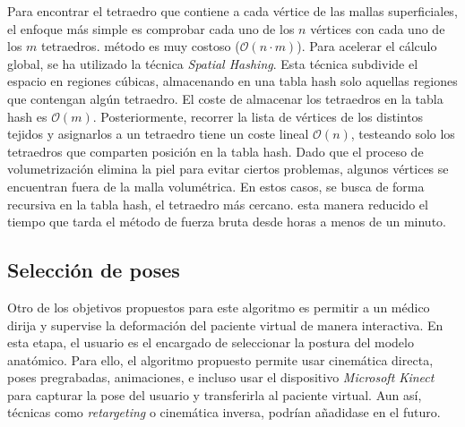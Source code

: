 Para encontrar el tetraedro que contiene a cada vértice de las mallas superficiales, el enfoque más simple es comprobar cada uno de los $n$ vértices con cada uno de los $m$ tetraedros. 
%
  método es muy costoso ($\mathcal{O}(n \cdot m)$). Para acelerar el cálculo global, se ha utilizado la técnica \emph{Spatial Hashing}\cite{Teschner2003}. Esta técnica subdivide el espacio en regiones cúbicas, almacenando en una \ac{tabla hash} solo aquellas regiones que contengan algún tetraedro. El coste de almacenar los tetraedros en la \ac{tabla hash} es $\mathcal{O}(m)$. Posteriormente, recorrer la lista de vértices de los distintos tejidos y asignarlos a un tetraedro tiene un coste lineal $\mathcal{O}(n)$, testeando solo los tetraedros que comparten posición en la \ac{tabla hash}. Dado que el proceso de volumetrización elimina la piel para evitar ciertos problemas, algunos vértices se encuentran fuera de la malla volumétrica. En estos casos, se busca de forma recursiva en la \ac{tabla hash}, el tetraedro más cercano.
  esta manera   reducido el tiempo que tarda el método de fuerza bruta desde horas a menos de un minuto.




\subsection{Selección de poses}
\label{posing:Poses}
%
Otro de los objetivos propuestos para este algoritmo es permitir a un médico  dirija y supervise la deformación del paciente virtual de manera interactiva. %
En esta etapa, el usuario es el encargado de seleccionar la postura del modelo anatómico. Para ello, el algoritmo propuesto permite usar cinemática directa, poses pregrabadas, animaciones, e incluso usar el dispositivo \emph{Microsoft Kinect}~\cite{shotton2013} para capturar la pose del usuario y transferirla al paciente virtual. Aun así, técnicas como \emph{retargeting} \cite{7581666} o cinemática inversa, podrían añadidase en el futuro. %

